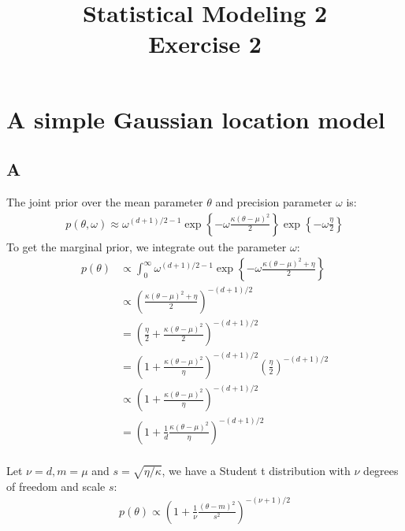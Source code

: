 \documentclass{article}
\title{Statistical Modeling 2 \\ Exercise 2}
\begin{document}
\maketitle
\section{A simple Gaussian location model}
\subsection*{A}
The joint prior over the mean parameter \(\theta\) and precision parameter \(\omega\) is:
\begin{align*}
p(\theta, \omega) \approx \omega^{(d+1)/2-1} \exp \left\lbrace -\omega\frac{\kappa(\theta-\mu)^2}{2}\right\rbrace \exp \left\lbrace -\omega\frac{\eta}{2} \right\rbrace
\end{align*}
To get the marginal prior, we integrate out the parameter \(\omega\):
\begin{align*}
p(\theta) &\propto \int_0^{\infty} \omega^{(d+1)/2-1} \exp \left\lbrace -\omega\frac{\kappa(\theta-\mu)^2 + \eta}{2}\right\rbrace\\
&\propto \left(\frac{\kappa(\theta-\mu)^2 + \eta}{2}\right)^{-(d+1)/2} \\
&= \left(\frac{\eta}{2} + \frac{\kappa(\theta-\mu)^2}{2}\right)^{-(d+1)/2} \\
&= \left(1 + \frac{\kappa(\theta-\mu)^2}{\eta}\right)^{-(d+1)/2} \left(\frac{\eta}{2}\right)^{-(d+1)/2} \\
&\propto \left(1 + \frac{\kappa(\theta-\mu)^2}{\eta}\right)^{-(d+1)/2}\\
&=\left(1 + \frac{1}{d}\frac{\kappa(\theta-\mu)^2}{\eta}\right)^{-(d+1)/2}\\
\end{align*}

Let \(\nu = d, m = \mu\) and \(s = \sqrt{\eta/\kappa}\), we have a Student t distribution with \(\nu\) degrees of freedom and scale \(s\):
\begin{align*}
p(\theta) \propto \left(1 + \frac{1}{\nu}\frac{(\theta-m)^2}{s^2}\right)^{-(\nu+1)/2}\\
\end{align*}
\end{document}
